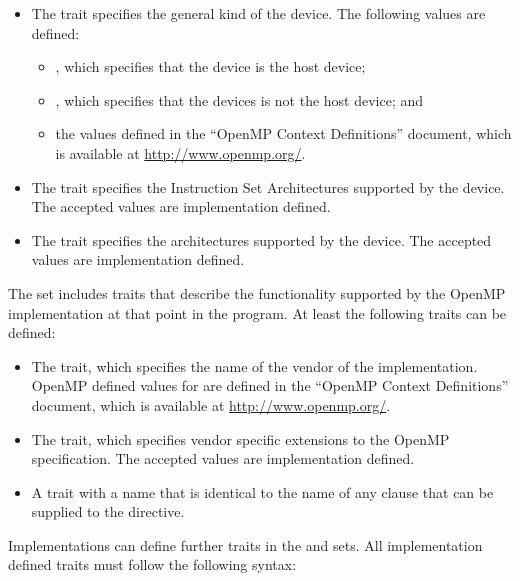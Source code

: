 \begin{itemize}
\item The  trait specifies the general kind of the 
      device. The following  values are defined:
\begin{itemize}
\item {}, which specifies that the device is the host device;
\item {}, which specifies that the devices is not the host device; and
\item the values defined in the ``OpenMP Context Definitions'' document,
      which is available at \url{http://www.openmp.org/}.
\end{itemize}

\item The  trait specifies the Instruction Set 
      Architectures supported by the device. The accepted  
      values are implementation defined.
\item The  trait specifies the architectures 
     supported by the device. The accepted  values are 
      implementation defined.
\end{itemize}

The  set includes traits that describe the functionality 
supported by the OpenMP implementation at that point in the program. At least 
the following traits can be defined:

\begin{itemize}
\item The  trait, which specifies the name of the
      vendor of the implementation. OpenMP defined values for 
      are defined in the ``OpenMP Context Definitions'' document, which is
      available at \url{http://www.openmp.org/}.
\item The  trait, which specifies vendor
      specific extensions to the OpenMP specification. The accepted
       values are implementation defined.
\item A trait with a name that is identical to the name of any clause that can be
      supplied to the  directive.
\end{itemize}

Implementations can define further traits in the  and 
sets. All implementation defined traits must follow the following syntax:

